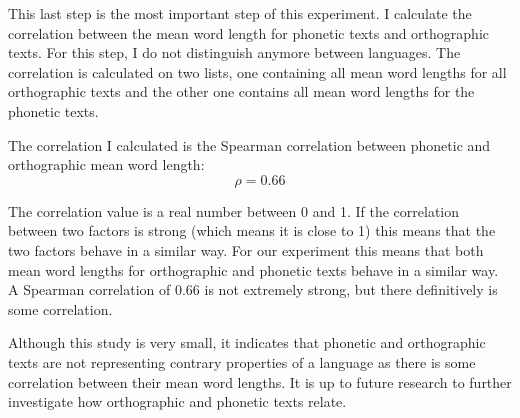 \begin{description}[style=unboxed]
\item[\textsc{4. step - Calculating correlation}] This last step is the most important step of this experiment. I calculate the correlation between the mean word length for phonetic texts and orthographic texts. For this step, I do not distinguish anymore between languages. The correlation is calculated on two lists, one containing all mean word lengths for all orthographic texts and the other one contains all mean word lengths for the phonetic texts.

The correlation I calculated is the Spearman correlation between phonetic and orthographic mean word length:
$$ \rho = 0.66$$


The correlation value is a real number between 0 and 1. If the correlation between two factors is strong (which means it is close to 1) this means that the two factors behave in a similar way. For our experiment this means that both mean word lengths for orthographic and phonetic texts behave in a similar way. A Spearman correlation of $0.66$ is not extremely strong, but there definitively is some correlation. 
\end{description}

Although this study is very small, it indicates that phonetic and orthographic texts are not representing contrary properties of a language as there is some correlation between their mean word lengths. It is up to future research to further investigate how orthographic and phonetic texts relate.








